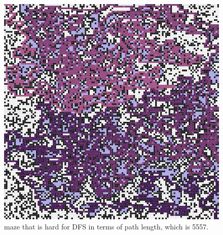 \documentclass[letter]{article}
\begin{document}
\begin{enumerate}[resume]
\begin{enumerate}
\begin{enumerate}
\begin{figure}
						\includegraphics[width=\textwidth]{../pics/dp/5557.png}
						\caption{\label{fig:dp1}maze that is hard for DFS in terms of path length, which is 5557.}
						

\end{figure}
\end{enumerate}
\end{enumerate}
\end{enumerate}
\end{document}
